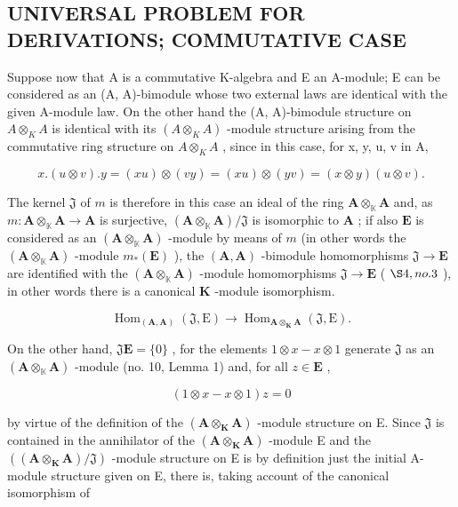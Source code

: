 \subsection{UNIVERSAL PROBLEM FOR DERIVATIONS; COMMUTATIVE CASE}

Suppose now that A is a commutative K-algebra and E an A-module; E can be considered as an (A, A)-bimodule whose two external laws are identical with the given A-module law. On the other hand the (A, A)-bimodule structure on \(A \otimes_{K} A\) is identical with its \((A \otimes_{K} A)\) -module structure arising from the commutative ring structure on \(A \otimes_{K} A\) , since in this case, for x, y, u, v in A,

\[
x. (u \otimes v). y = (x u) \otimes (v y) = (x u) \otimes (y v) = (x \otimes y) (u \otimes v).
\]

The kernel \(\mathfrak{J}\) of \(m\) is therefore in this case an ideal of the ring \(\mathbf{A} \otimes_{\mathbb{K}} \mathbf{A}\) and, as \(m: \mathbf{A} \otimes_{\mathbb{K}} \mathbf{A} \to \mathbf{A}\) is surjective, \((\mathbf{A} \otimes_{\mathbb{K}} \mathbf{A}) / \mathfrak{J}\) is isomorphic to \(\mathbf{A}\) ; if also \(\mathbf{E}\) is considered as an \((\mathbf{A} \otimes_{\mathbb{K}} \mathbf{A})\) -module by means of \(m\) (in other words the \((\mathbf{A} \otimes_{\mathbb{K}} \mathbf{A})\) -module \(m_*(\mathbf{E})\) ), the \((\mathbf{A}, \mathbf{A})\) -bimodule homomorphisms \(\mathfrak{J} \to \mathbf{E}\) are identified with the \((\mathbf{A} \otimes_{\mathbb{K}} \mathbf{A})\) -module homomorphisms \(\mathfrak{J} \to \mathbf{E}\) ( \(\S 4, no. 3\) ), in other words there is a canonical \(\mathbf{K}\) -module isomorphism.

\[
\operatorname{Hom} _ {(\mathbf {A}, \mathbf {A})} (\mathfrak{J} , \mathrm{E}) \rightarrow \operatorname{Hom} _ {\mathbf {A} \otimes_ {\mathbf {K}} \mathbf {A}} (\mathfrak{J} , \mathrm{E}).
\]

On the other hand, \(\mathfrak{J}\mathbf{E} = \{0\}\) , for the elements \(1 \otimes x - x \otimes 1\) generate \(\mathfrak{J}\) as an \((\mathbf{A} \otimes_{\mathbb{K}} \mathbf{A})\) -module (no. 10, Lemma 1) and, for all \(z \in \mathbf{E}\) ,

\[
(1 \otimes x - x \otimes 1) z = 0
\]

by virtue of the definition of the \((\mathbf{A} \otimes_{\mathbf{K}} \mathbf{A})\) -module structure on E. Since \(\mathfrak{J}\) is contained in the annihilator of the \((\mathbf{A} \otimes_{\mathbf{K}} \mathbf{A})\) -module E and the \(((\mathbf{A} \otimes_{\mathbf{K}} \mathbf{A})/\mathfrak{J})\) -module structure on E is by definition just the initial A-module structure given on E, there is, taking account of the canonical isomorphism of

